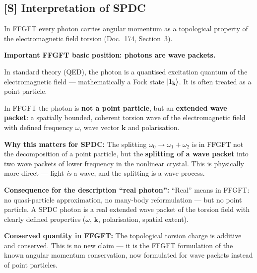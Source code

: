 \subsection{[S] Interpretation of SPDC}

\begin{foundation}
In FFGFT every photon carries angular momentum as a
topological property of the electromagnetic field torsion
(Doc.~174, Section~3).

\textbf{Important FFGFT basic position: photons are wave packets.}

In standard theory (QED), the photon is a quantised
excitation quantum of the electromagnetic field --- mathematically
a Fock state $\left|1_\mathbf{k}\right\rangle$.
It is often treated as a point particle.

In FFGFT the photon is \textbf{not a point particle},
but an \textbf{extended wave packet}:
a spatially bounded, coherent torsion wave of the
electromagnetic field with defined frequency $\omega$,
wave vector $\mathbf{k}$ and polarisation.

\textbf{Why this matters for SPDC:}
The splitting $\omega_0 \to \omega_1 + \omega_2$ is
in FFGFT not the decomposition of a point particle,
but the \textbf{splitting of a wave packet}
into two wave packets of lower frequency in the nonlinear crystal.
This is physically more direct --- light \emph{is} a wave,
and the splitting is a wave process.

\begin{center}
\end{center}

\textbf{Consequence for the description ``real photon'':}
``Real'' means in FFGFT: no quasi-particle approximation,
no many-body reformulation --- but no point particle.
A SPDC photon is a real extended wave packet
of the torsion field with clearly defined properties
($\omega$, $\mathbf{k}$, polarisation, spatial extent).

\textbf{Conserved quantity in FFGFT:}
The topological torsion charge is additive and conserved.
This is no new claim --- it is the FFGFT formulation
of the known angular momentum conservation, now formulated
for wave packets instead of point particles.
\end{foundation}

